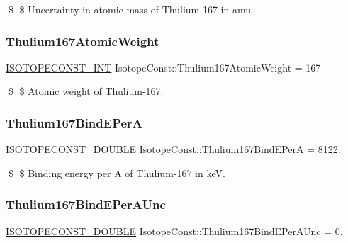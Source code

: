 \$ \$ Uncertainty in atomic mass of Thulium-\/167 in amu. \mbox{\label{group___isotope_const-_thulium-_tm167_ga2a5983fedacd095e4dfbdfb64279f0a2}} 
\subsubsection{\texorpdfstring{Thulium167\+Atomic\+Weight}{Thulium167AtomicWeight}}
{\footnotesize\ttfamily \mbox{\hyperlink{group___isotope_const-_macros_ga5f18360b3e99483a35c32d789e62621c}{I\+S\+O\+T\+O\+P\+E\+C\+O\+N\+S\+T\+\_\+\+I\+NT}} Isotope\+Const\+::\+Thulium167\+Atomic\+Weight = 167}

\$ \$ Atomic weight of Thulium-\/167. \mbox{\label{group___isotope_const-_thulium-_tm167_gad4c02644ae4f1bcbd2b6652814f35270}} 
\subsubsection{\texorpdfstring{Thulium167\+Bind\+E\+PerA}{Thulium167BindEPerA}}
{\footnotesize\ttfamily \mbox{\hyperlink{group___isotope_const-_macros_ga8f45a7272ce02c0b4c65c44636ed719a}{I\+S\+O\+T\+O\+P\+E\+C\+O\+N\+S\+T\+\_\+\+D\+O\+U\+B\+LE}} Isotope\+Const\+::\+Thulium167\+Bind\+E\+PerA = 8122.}

\$ \$ Binding energy per A of Thulium-\/167 in keV. \mbox{\label{group___isotope_const-_thulium-_tm167_ga7432a19e836c40c8946910a657653da5}} 
\subsubsection{\texorpdfstring{Thulium167\+Bind\+E\+Per\+A\+Unc}{Thulium167BindEPerAUnc}}
{\footnotesize\ttfamily \mbox{\hyperlink{group___isotope_const-_macros_ga8f45a7272ce02c0b4c65c44636ed719a}{I\+S\+O\+T\+O\+P\+E\+C\+O\+N\+S\+T\+\_\+\+D\+O\+U\+B\+LE}} Isotope\+Const\+::\+Thulium167\+Bind\+E\+Per\+A\+Unc = 0.}

